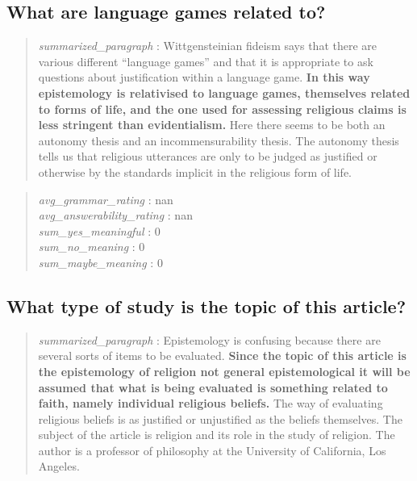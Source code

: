 \hypertarget{what-are-language-games-related-to}{%
\subsection{What are language games related
to?}\label{what-are-language-games-related-to}}

\begin{quote}
\emph{summarized\_paragraph} : Wittgensteinian fideism says that there
are various different ``language games'' and that it is appropriate to
ask questions about justification within a language game. \textbf{In
this way epistemology is relativised to language games, themselves
related to forms of life, and the one used for assessing religious
claims is less stringent than evidentialism.} Here there seems to be
both an autonomy thesis and an incommensurability thesis. The autonomy
thesis tells us that religious utterances are only to be judged as
justified or otherwise by the standards implicit in the religious form
of life.
\end{quote}

\begin{quote}
\emph{avg\_grammar\_rating} : nan\\
\emph{avg\_answerability\_rating} : nan\\
\emph{sum\_yes\_meaningful} : 0\\
\emph{sum\_no\_meaning} : 0\\
\emph{sum\_maybe\_meaning} : 0
\end{quote}

\hypertarget{what-type-of-study-is-the-topic-of-this-article}{%
\subsection{What type of study is the topic of this
article?}\label{what-type-of-study-is-the-topic-of-this-article}}

\begin{quote}
\emph{summarized\_paragraph} : Epistemology is confusing because there
are several sorts of items to be evaluated. \textbf{Since the topic of
this article is the epistemology of religion not general epistemological
it will be assumed that what is being evaluated is something related to
faith, namely individual religious beliefs.} The way of evaluating
religious beliefs is as justified or unjustified as the beliefs
themselves. The subject of the article is religion and its role in the
study of religion. The author is a professor of philosophy at the
University of California, Los Angeles.
\end{quote}

